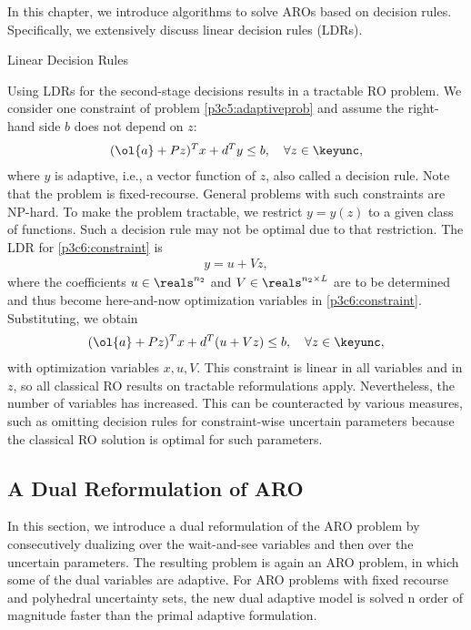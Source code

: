In this chapter, we introduce algorithms to solve AROs based on decision rules. Specifically, we extensively discuss linear decision rules (LDRs).

\begin{section}{Linear Decision Rules}

Using LDRs for the second-stage decisions results in a tractable RO problem. We consider one constraint of problem \ref{p3c5:adaptiveprob} and assume the right-hand side $b$ does not depend on $z$:
\begin{align}\label{p3c6:constraint}
(\ol{a}+Pz)^Tx+d^Ty \leq b, \quad \forall z\in\keyunc,
\end{align}
where $y$ is adaptive, i.e., a vector function of $z$, also called a decision rule. Note that the problem is fixed-recourse. General problems with such constraints are NP-hard. To make the problem tractable, we restrict $y = y(z)$ to a given class of functions. Such a decision rule may not be optimal due to that restriction. The LDR for \eqref{p3c6:constraint} is 
\begin{align}
y = u+Vz,
\end{align}
where the coefficients $u\in\reals^{n_2}$ and $V\in\reals^{n_2\times L}$ are to be determined and thus become here-and-now optimization variables in \eqref{p3c6:constraint}. Substituting, we obtain
\begin{align}
(\ol{a}+Pz)^Tx+d^T(u+Vz) \leq b, \quad \forall z\in\keyunc,
\end{align}
with optimization variables $x,u,V$. This constraint is linear in all variables and in $z$, so all classical RO results on tractable reformulations apply. Nevertheless, the number of variables has increased. This can be counteracted by various measures, such as omitting decision rules for constraint-wise uncertain parameters because the classical RO solution is optimal for such parameters.

\section{A Dual Reformulation of ARO}

In this section, we introduce a dual reformulation of the ARO problem by consecutively dualizing over the wait-and-see variables and then over the uncertain parameters. The resulting problem is again an ARO problem, in which some of the dual variables are adaptive. For ARO problems with fixed recourse and polyhedral uncertainty sets, the new dual adaptive model is solved n order of magnitude faster than the primal adaptive formulation.


\end{section}
